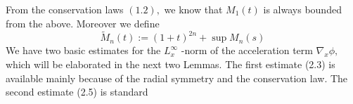 







From the conservation laws $(1.2),$ we know that $M_{1}(t)$ is always bounded from the above. Moreover we define
\[
\tilde{M}_{n}(t):=(1+t)^{2 n}+\sup M_{n}(s)
\]
We have two basic estimates for the $L_{x}^{\infty}$ -norm of the acceleration term $\nabla_{x} \phi,$ which will be elaborated in the next two Lemmas. The first estimate (2.3) is available mainly because of the radial symmetry and the conservation law. The second estimate (2.5) is standard 



